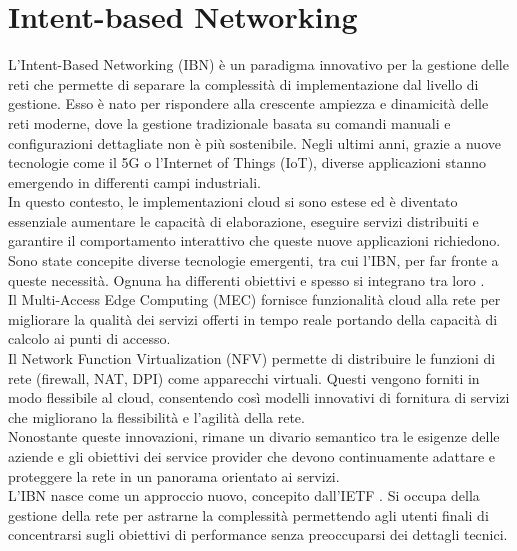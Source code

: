 \section{Intent-based Networking}
\label{ch:IBN}
L'Intent-Based Networking (IBN) è un paradigma innovativo per la gestione delle reti che permette di separare la complessità di implementazione dal livello di gestione.
Esso è nato per rispondere alla crescente ampiezza e dinamicità delle reti moderne, dove la gestione tradizionale basata su comandi manuali e configurazioni dettagliate non è più sostenibile.
Negli ultimi anni, grazie a nuove tecnologie come il 5G o l'Internet of Things (IoT), diverse applicazioni stanno emergendo in differenti campi industriali.
\\In questo contesto, le implementazioni cloud si sono estese ed è diventato essenziale aumentare le capacità di elaborazione, eseguire servizi distribuiti e garantire il 
comportamento interattivo che queste nuove applicazioni richiedono.
Sono state concepite diverse tecnologie emergenti, tra cui l'IBN, per far fronte a queste necessità. Ognuna ha differenti obiettivi e spesso si integrano tra loro \cite{ibn}.
\\Il Multi-Access Edge Computing\cite{mec} (MEC) fornisce funzionalità cloud alla rete per migliorare la qualità dei servizi offerti in tempo reale portando della capacità di calcolo ai punti di accesso.
\\Il Network Function Virtualization\cite{nfv} (NFV) permette di distribuire le funzioni di rete (firewall, NAT, DPI) come apparecchi virtuali. Questi vengono forniti in modo flessibile al cloud, consentendo 
così modelli innovativi di fornitura di servizi che migliorano la flessibilità e l'agilità della rete.
\\Nonostante queste innovazioni, rimane un divario semantico tra le esigenze delle aziende e gli obiettivi dei service provider che devono continuamente adattare e proteggere la rete in un panorama orientato ai servizi.
\\L'IBN nasce come un approccio nuovo, concepito dall'IETF \cite{ietf}. Si occupa della gestione della rete per astrarne la complessità permettendo agli utenti finali di concentrarsi sugli obiettivi di performance senza preoccuparsi dei dettagli tecnici.
